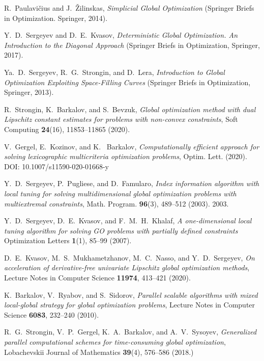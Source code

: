 \documentclass[
11pt,%
tightenlines,%
twoside,%
onecolumn,%
nofloats,%
nobibnotes,%
nofootinbib,%
superscriptaddress,%
noshowpacs,%
centertags]%
{revtex4}
\begin{document}
\begin{thebibliography}{99}
R.~Paulavi\v{c}ius and J.~\v{Z}ilinskas, \textit{Simplicial Global Optimization} (Springer Briefs in Optimization. Springer, 2014).

Y.~D.~Sergeyev and D.~E.~Kvasov, \textit{Deterministic Global Optimization. An Introduction to the Diagonal Approach}  (Springer Briefs in Optimization, Springer, 2017).




Ya.~D.~Sergeyev, R.~G.~Strongin, and D.~Lera, \textit{Introduction
to Global Optimization Exploiting Space-Filling Curves} (Springer
Briefs in Optimization, Springer, 2013).


R.~Strongin, K.~Barkalov, and S.~Bevzuk, \textit{Global optimization
method with dual Lipschitz constant estimates for problems with
non-convex constraints}, Soft Computing \textbf{24}(16),
11853--11865 (2020).

V.~Gergel, E.~Kozinov, and K.~ Barkalov, \textit{Computationally
efficient approach for solving lexicographic multicriteria
optimization problems}, Optim. Lett. (2020). DOI:
10.1007/s11590-020-01668-y

Y.~D.~Sergeyev, P.~Pugliese, and D.~Famularo, \textit{Index
information algorithm with local tuning for solving multidimensional
global optimization problems with multiextremal constraints}, Math.
Program. \textbf{96}(3), 489--512 (2003). 2003.

Y.~D.~Sergeyev, D.~E.~Kvasov, and F.~M.~H.~Khalaf, \textit{A
one-dimensional local tuning algorithm for solving GO problems with
partially defined constraints} Optimization Letters \textbf{1}(1),
85--99 (2007).

D.~E.~Kvasov, M.~S.~Mukhametzhanov, M.~C.~Nasso, and Y.~D.~Sergeyev,
\textit{On acceleration of derivative-free univariate Lipschitz
global optimization methods}, Lecture Notes in Computer Science
\textbf{11974}, 413--421 (2020).

K.~Barkalov, V.~Ryabov, and S.~Sidorov, \textit{Parallel scalable
algorithms with mixed local-global strategy for global optimization
problems}, Lecture Notes in Computer Science \textbf{6083}, 232--240
(2010).

R.~G.~Strongin, V.~P.~Gergel, K.~A.~Barkalov, and A.~V.~Sysoyev,
\textit{Generalized parallel computational schemes for
time-consuming global optimization}, Lobachevskii Journal of
Mathematics \textbf{39}(4), 576--586 (2018.)


\end{thebibliography}
\end{document}
